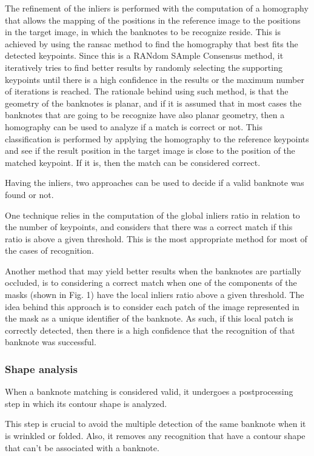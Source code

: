 The refinement of the inliers is performed with the computation of a homography that allows the mapping of the positions in the reference image to the positions in the target image, in which the banknotes to be recognize reside. This is achieved by using the \gls{ransac} \cite{Fischler1981} method to find the homography that best fits the detected keypoints. Since this is a RANdom SAmple Consensus method, it iteratively tries to find better results by randomly selecting the supporting keypoints until there is a high confidence in the results or the maximum number of iterations is reached. The rationale behind using such method, is that the geometry of the banknotes is planar, and if it is assumed that in most cases the banknotes that are going to be recognize have also planar geometry, then a homography can be used to analyze if a match is correct or not. This classification is performed by applying the homography to the reference keypoints and see if the result position in the target image is close to the position of the matched keypoint. If it is, then the match can be considered correct.

Having the inliers, two approaches can be used to decide if a valid banknote was found or not.

One technique relies in the computation of the global inliers ratio in relation to the number of keypoints, and considers that there was a correct match if this ratio is above a given threshold. This is the most appropriate method for most of the cases of recognition.

Another method that may yield better results when the banknotes are partially occluded, is to considering a correct match when one of the components of the masks (shown in Fig. 1) have the local inliers ratio above a given threshold. The idea behind this approach is to consider each patch of the image represented in the mask as a unique identifier of the banknote. As such, if this local patch is correctly detected, then there is a high confidence that the recognition of that banknote was successful.


\subsubsection{Shape analysis}\label{sec:shape-analysis}

When a banknote matching is considered valid, it undergoes a postprocessing step in which its contour shape is analyzed.

This step is crucial to avoid the multiple detection of the same banknote when it is wrinkled or folded. Also, it removes any recognition that have a contour shape that can't be associated with a banknote.

